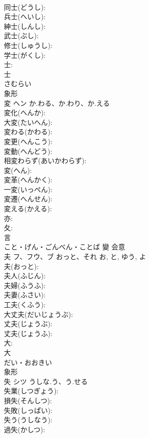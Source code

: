 \documentclass[8pt]{extreport}
\begin{document}
\begin{CJK}{UTF8}{min}
\\	同士(どうし): 
\\	兵士(へいし): 
\\	紳士(しんし): 
\\	武士(ぶし): 
\\	修士(しゅうし): 
\\	学士(がくし): 
\\	士: 
\\	士	
\\	さむらい	
\\	象形 
\\	変	ヘン	か.わる、か.わり、か.える		
\\	変化(へんか): 
\\	大変(たいへん): 
\\	変わる(かわる): 
\\	変更(へんこう): 
\\	変動(へんどう): 
\\	相変わらず(あいかわらず): 
\\	変(へん): 
\\	変革(へんかく): 
\\	一変(いっぺん): 
\\	変遷(へんせん): 
\\	変える(かえる): 
\\	亦: 
\\	夂: 
\\	言	
\\	こと・げん・ごんべん・ことば	變	会意 
\\	夫	フ、フウ、ブ	おっと、それ	お, と, ゆう, よ	
\\	夫(おっと): 
\\	夫人(ふじん): 
\\	夫婦(ふうふ): 
\\	夫妻(ふさい): 
\\	工夫(くふう): 
\\	大丈夫(だいじょうぶ): 
\\	丈夫(じょうぶ): 
\\	丈夫(じょうふ): 
\\	大: 
\\	大	
\\	だい・おおきい	
\\	象形 
\\	失	シツ	うしな.う、う.せる		
\\	失業(しつぎょう): 
\\	損失(そんしつ): 
\\	失敗(しっぱい): 
\\	失う(うしなう): 
\\	過失(かしつ): 

\end{CJK}
\end{document}
